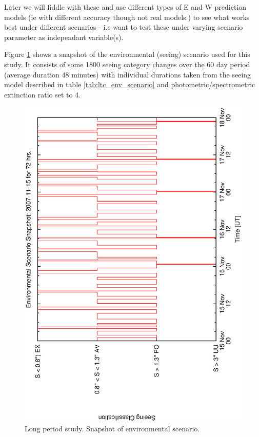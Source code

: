 Later we will fiddle with these and use different types of E and W prediction models (ie with different accuracy though not real models.) to see what works best under different scenarios - i.e want to test these under varying scenario parameter as independant variable(s).

Figure \ref{fig:env_snap_1} shows a snapshot of the environmental (seeing) scenario used for this study. It consists of some 1800 seeing category changes over the 60 day period (average duration 48 minutes) with individual durations taken from the seeing model described in table \ref{tab:ltc_env_scenario} and photometric/spectrometric extinction ratio set to 4.

\begin{figure}[h]
\begin{center}
 \includegraphics[scale=0.5, angle=-90]{figures/env_snapshot_2007-11-15_72.eps}
 \caption[Environmental scenario 2007-11-15 (72 hour snapshot).] 
   {Long period study. Snapshot of environmental scenario.}
\end{center} 
\label{fig:env_snap_1}
\end{figure}

